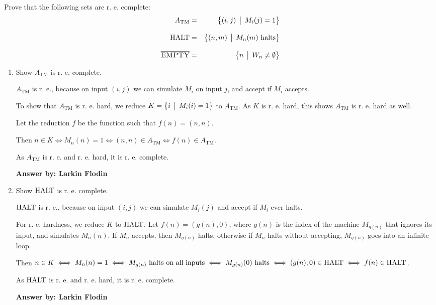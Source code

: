 \documentclass[12pt]{article}
\begin{document}
\noindent{}
\addtocounter{section}{1}

Prove that the following sets are r. e. complete:
\begin{eqnarray*}
A_{\text{TM}} &=& \bigl\{ (i, j) \,\bigm|\, M_i(j) = 1 \bigr\} \\[2ex]
\mbox{{\rm HALT}} &=& \bigl\{ (n, m) \,\bigm|\, M_n(m) \mbox{ halts} \bigr\} \\[2ex]
\overline{\mbox{{\rm\sc EMPTY}}} &=& \bigl\{ n \,\bigm|\, W_n \neq \emptyset \bigr\}
\end{eqnarray*}

\begin{enumerate}
\item Show $A_{\text{TM}}$ is r. e. complete.

$A_{\text{TM}}$ is r. e., because on input $(i, j)$ we can simulate $M_i$ on input $j$, and accept if $M_i$ accepts.

To show that $A_{\text{TM}}$ is r. e. hard, we reduce $K = \bigl\{ i \,\bigm|\, M_i(i) = 1 \bigr\}$ to $A_{\text{TM}}$. As $K$ is r. e. hard, this shows $A_{\text{TM}}$ is r. e. hard as well.

Let the reduction $f$ be the function such that $f(n) = (n, n)$.

Then $n \in K \iff M_n(n) = 1 \iff (n, n) \in A_{\text{TM}} \iff f(n) \in A_{\text{TM}}$.

As $A_{\text{TM}}$ is r. e. and r. e. hard, it is r. e. complete.

{\bf Answer by: Larkin Flodin} 

\item Show $\mbox{{\rm HALT}}$ is r. e. complete.

$\mbox{{\rm HALT}}$ is r. e., because on input $(i, j)$ we can simulate $M_i(j)$ and accept if $M_i$ ever halts.

For r. e. hardness, we reduce $K$ to $\mbox{{\rm HALT}}$. Let $f(n) = (g(n), 0)$, where $g(n)$ is the index of the machine $M_{g(n)}$ that ignores its input, and simulates $M_n(n)$. If $M_n$ accepts, then $M_{g(n)}$ halts, otherwise if $M_n$ halts without accepting, $M_{g(n)}$ goes into an infinite loop.

Then $n \in K \iff M_n(n) = 1 \iff M_{g(n)} \textrm{ halts on all inputs} \iff M_{g(n)}(0) \textrm{ halts} \iff (g(n), 0) \in \mbox{{\rm HALT}} \iff f(n) \in \mbox{{\rm HALT}}$.

As $\mbox{{\rm HALT}}$ is r. e. and r. e. hard, it is r. e. complete.

{\bf Answer by: Larkin Flodin} 


\end{enumerate}
\end{document}
